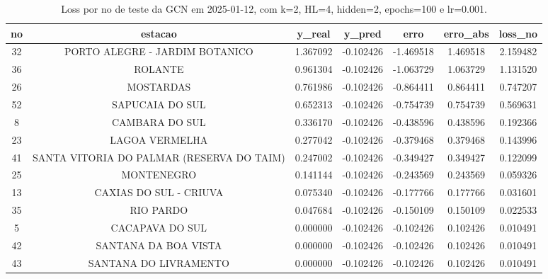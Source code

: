 \begin{table}[h]
\centering
\caption{Loss por no de teste da GCN em 2025-01-12, com k=2, HL=4, hidden=2, epochs=100 e lr=0.001.}
\label{tab:gcn_loss_k2_hl4_h2_e100_d20250112}
\begin{tabular}{ccccccc}
\toprule
no & estacao & y\_real & y\_pred & erro & erro\_abs & loss\_no \\
\midrule
32 & PORTO ALEGRE - JARDIM BOTANICO & 1.367092 & -0.102426 & -1.469518 & 1.469518 & 2.159482 \\
36 & ROLANTE & 0.961304 & -0.102426 & -1.063729 & 1.063729 & 1.131520 \\
26 & MOSTARDAS & 0.761986 & -0.102426 & -0.864411 & 0.864411 & 0.747207 \\
52 & SAPUCAIA DO SUL & 0.652313 & -0.102426 & -0.754739 & 0.754739 & 0.569631 \\
8 & CAMBARA DO SUL & 0.336170 & -0.102426 & -0.438596 & 0.438596 & 0.192366 \\
23 & LAGOA VERMELHA & 0.277042 & -0.102426 & -0.379468 & 0.379468 & 0.143996 \\
41 & SANTA VITORIA DO PALMAR (RESERVA DO TAIM) & 0.247002 & -0.102426 & -0.349427 & 0.349427 & 0.122099 \\
25 & MONTENEGRO & 0.141144 & -0.102426 & -0.243569 & 0.243569 & 0.059326 \\
13 & CAXIAS DO SUL - CRIUVA & 0.075340 & -0.102426 & -0.177766 & 0.177766 & 0.031601 \\
35 & RIO PARDO & 0.047684 & -0.102426 & -0.150109 & 0.150109 & 0.022533 \\
5 & CACAPAVA DO SUL & 0.000000 & -0.102426 & -0.102426 & 0.102426 & 0.010491 \\
42 & SANTANA DA BOA VISTA & 0.000000 & -0.102426 & -0.102426 & 0.102426 & 0.010491 \\
43 & SANTANA DO LIVRAMENTO & 0.000000 & -0.102426 & -0.102426 & 0.102426 & 0.010491 \\
\bottomrule
\end{tabular}
\end{table}
